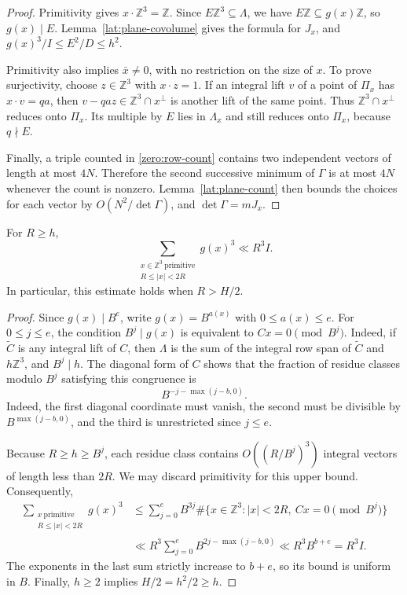 \begin{proof}
Primitivity gives $x\cdot\mathbb Z^3=\mathbb Z$.  Since
$E\mathbb Z^3\subseteq\Lambda$, we have
$E\mathbb Z\subseteq g(x)\mathbb Z$, so $g(x)\mid E$.
Lemma~\ref{lat:plane-covolume} gives the formula for $J_x$, and
$g(x)^3/I\le E^2/D\le h^2$.

Primitivity also implies $\bar x\ne0$, with no restriction on the
size of $x$.  To prove surjectivity, choose $z\in\mathbb Z^3$ with
$x\cdot z=1$.  If an integral lift $v$ of a point of $\Pi_x$ has
$x\cdot v=qa$, then $v-qaz\in\mathbb Z^3\cap x^\perp$ is another
lift of the same point.  Thus $\mathbb Z^3\cap x^\perp$ reduces
onto $\Pi_x$.  Its multiple by $E$ lies in $\Lambda_x$ and still
reduces onto $\Pi_x$, because $q\nmid E$.

Finally, a triple counted in \eqref{zero:row-count} contains two
independent vectors of length at most $4N$.  Therefore the second
successive minimum of $\Gamma$ is at most $4N$ whenever the count
is nonzero.  Lemma~\ref{lat:plane-count} then bounds the choices for
each vector by $O(N^2/\det\Gamma)$, and
$\det\Gamma=mJ_x$.
\end{proof}

\begin{lemma}\label{zero:moment}
For $R\ge h$,
\begin{equation}\label{zero:moment-bound}
 \sum_{\substack{x\in\mathbb Z^3\ \mathrm{primitive}\\
                  R\le |x|<2R}}g(x)^3
 \ll R^3 I.
\end{equation}
In particular, this estimate holds when $R>H/2$.
\end{lemma}

\begin{proof}
Since $g(x)\mid B^e$, write $g(x)=B^{a(x)}$ with
$0\le a(x)\le e$.  For $0\le j\le e$, the condition
$B^j\mid g(x)$ is equivalent to
$Cx=0\pmod{B^j}$.  Indeed, if $\widetilde C$ is any integral lift
of $C$, then $\Lambda$ is the sum of the integral row span of
$\widetilde C$ and $h\mathbb Z^3$, and $B^j\mid h$.
The diagonal form of $C$ shows that the fraction of residue
classes modulo $B^j$ satisfying this congruence is
\[
 B^{-j-\max(j-b,0)}.
\]
Indeed, the first diagonal coordinate must vanish, the second
must be divisible by $B^{\max(j-b,0)}$, and the third is
unrestricted since $j\le e$.

Because $R\ge h\ge B^j$, each residue class contains
$O((R/B^j)^3)$ integral vectors of length less than $2R$.
We may discard primitivity for this upper bound.  Consequently,
\begin{align*}
 \sum_{\substack{x\ \mathrm{primitive}\\R\le |x|<2R}}g(x)^3
 &\le \sum_{j=0}^e B^{3j}
       \#\{x\in\mathbb Z^3:|x|<2R,\ Cx=0\pmod{B^j}\}\\
 &\ll R^3\sum_{j=0}^e B^{2j-\max(j-b,0)}
 \ll R^3 B^{b+e}=R^3I.
\end{align*}
The exponents in the last sum strictly increase to $b+e$, so its
bound is uniform in $B$.  Finally, $h\ge2$ implies
$H/2=h^2/2\ge h$.
\end{proof}

